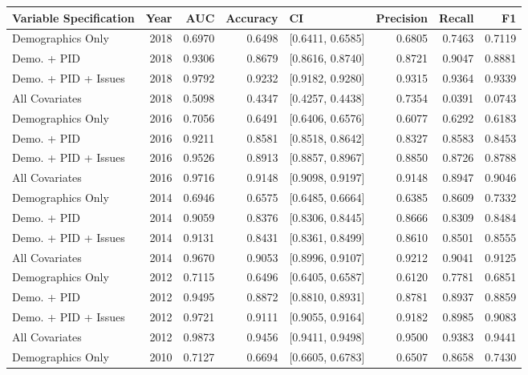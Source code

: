 \begin{table}[ht]
\centering
\begin{tabular}{lrrrlrrr}
  \toprule
Variable Specification & Year & AUC & Accuracy & CI & Precision & Recall & F1 \\ 
  \midrule
Demographics Only & 2018 & 0.6970 & 0.6498 & [0.6411, 0.6585] & 0.6805 & 0.7463 & 0.7119 \\ 
  Demo. + PID & 2018 & 0.9306 & 0.8679 & [0.8616, 0.8740] & 0.8721 & 0.9047 & 0.8881 \\ 
  Demo. + PID + Issues & 2018 & 0.9792 & 0.9232 & [0.9182, 0.9280] & 0.9315 & 0.9364 & 0.9339 \\ 
  All Covariates & 2018 & 0.5098 & 0.4347 & [0.4257, 0.4438] & 0.7354 & 0.0391 & 0.0743 \\ 
  Demographics Only & 2016 & 0.7056 & 0.6491 & [0.6406, 0.6576] & 0.6077 & 0.6292 & 0.6183 \\ 
  Demo. + PID & 2016 & 0.9211 & 0.8581 & [0.8518, 0.8642] & 0.8327 & 0.8583 & 0.8453 \\ 
  Demo. + PID + Issues & 2016 & 0.9526 & 0.8913 & [0.8857, 0.8967] & 0.8850 & 0.8726 & 0.8788 \\ 
  All Covariates & 2016 & 0.9716 & 0.9148 & [0.9098, 0.9197] & 0.9148 & 0.8947 & 0.9046 \\ 
  Demographics Only & 2014 & 0.6946 & 0.6575 & [0.6485, 0.6664] & 0.6385 & 0.8609 & 0.7332 \\ 
  Demo. + PID & 2014 & 0.9059 & 0.8376 & [0.8306, 0.8445] & 0.8666 & 0.8309 & 0.8484 \\ 
  Demo. + PID + Issues & 2014 & 0.9131 & 0.8431 & [0.8361, 0.8499] & 0.8610 & 0.8501 & 0.8555 \\ 
  All Covariates & 2014 & 0.9670 & 0.9053 & [0.8996, 0.9107] & 0.9212 & 0.9041 & 0.9125 \\ 
  Demographics Only & 2012 & 0.7115 & 0.6496 & [0.6405, 0.6587] & 0.6120 & 0.7781 & 0.6851 \\ 
  Demo. + PID & 2012 & 0.9495 & 0.8872 & [0.8810, 0.8931] & 0.8781 & 0.8937 & 0.8859 \\ 
  Demo. + PID + Issues & 2012 & 0.9721 & 0.9111 & [0.9055, 0.9164] & 0.9182 & 0.8985 & 0.9083 \\ 
  All Covariates & 2012 & 0.9873 & 0.9456 & [0.9411, 0.9498] & 0.9500 & 0.9383 & 0.9441 \\ 
  Demographics Only & 2010 & 0.7127 & 0.6694 & [0.6605, 0.6783] & 0.6507 & 0.8658 & 0.7430 \\ 

\end{tabular}
\end{table}
